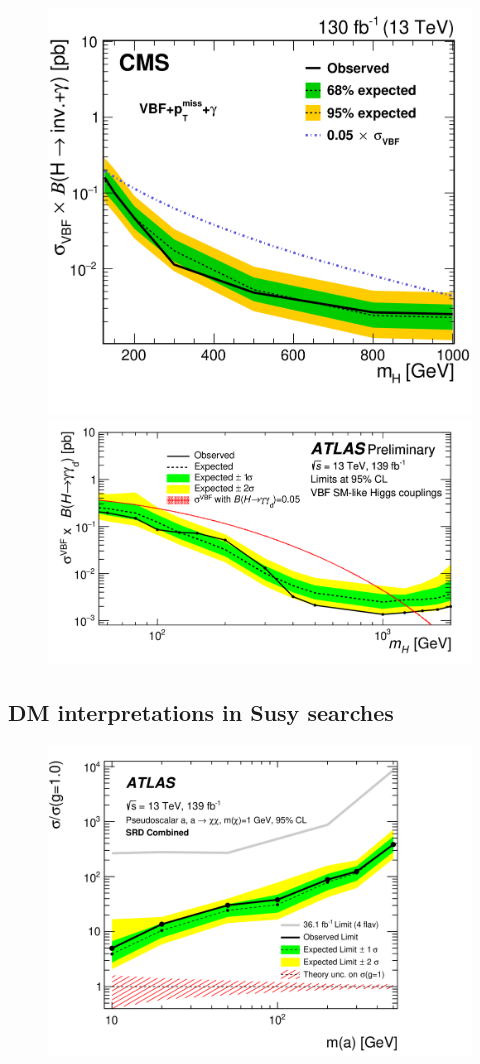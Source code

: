 \documentclass{moriond}
\begin{document}
\begin{figure} [htb]
\begin{minipage}{0.45\linewidth}
\centerline{\includegraphics[width=0.9\linewidth]{cmsvbf}}
\end{minipage}
\begin{minipage}{0.45\linewidth}
\centerline{\includegraphics[width=0.9\linewidth]{atlasvbf}}
\end{minipage}
\caption[]{}
\label{fig:vbf}
\end{figure}

\subsection{DM interpretations in Susy searches}

\begin{figure} [htb]
\centerline{\includegraphics[width=0.5\linewidth]{DMBB}}
\caption[]{}
\label{fig:dmbb}
\end{figure}
\end{document}
